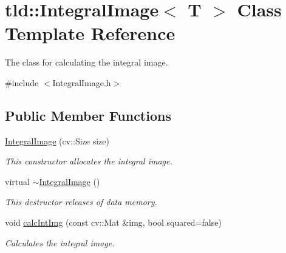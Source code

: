 \hypertarget{classtld_1_1IntegralImage}{\section{tld\-:\-:Integral\-Image$<$ T $>$ Class Template Reference}
\label{classtld_1_1IntegralImage}
}


The class for calculating the integral image.  




{\ttfamily \#include $<$Integral\-Image.\-h$>$}

\subsection*{Public Member Functions}
\begin{DoxyCompactItemize}
\item 
\hyperlink{classtld_1_1IntegralImage_abc8beb4ec0dcfb6f28645648f5849250}{Integral\-Image} (cv\-::\-Size size)
\begin{DoxyCompactList}\small\item\em This constructor allocates the integral image. \end{DoxyCompactList}\item 
virtual \hyperlink{classtld_1_1IntegralImage_a79213d3f8187e10f1dc49f0b7e499caa}{$\sim$\-Integral\-Image} ()
\begin{DoxyCompactList}\small\item\em This destructor releases of data memory. \end{DoxyCompactList}\item 
void \hyperlink{classtld_1_1IntegralImage_a85bb20526a40615c3d0d7c0b5e53b55a}{calc\-Int\-Img} (const cv\-::\-Mat \&img, bool squared=false)
\begin{DoxyCompactList}\small\item\em Calculates the integral image. \end{DoxyCompactList}\end{DoxyCompactItemize}
